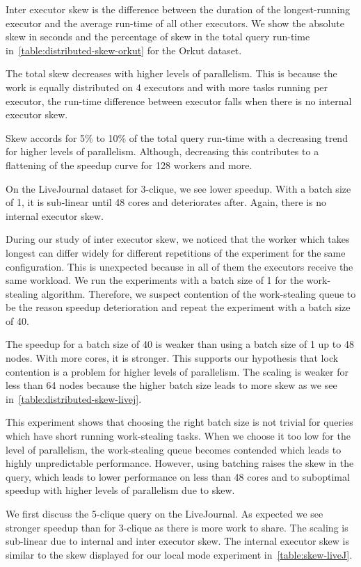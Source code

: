 Inter executor skew is the difference between the duration of the longest-running executor and the average
run-time of all other executors.
We show the absolute skew in seconds and the percentage of skew in the total query run-time
in~\cref{table:distributed-skew-orkut} for the Orkut dataset.

The total skew decreases with higher levels of parallelism.
This is because the work is equally distributed on 4 executors and with more tasks running per executor,
the run-time difference between executor falls when there is no internal executor skew.

Skew accords for 5\% to 10\% of the total query run-time with a decreasing trend for higher levels of
parallelism.
Although, decreasing this contributes to a flattening of the speedup curve for 128 workers and more.

On the LiveJournal dataset for 3-clique, we see lower speedup.
With a batch size of 1, it is sub-linear until 48 cores and deteriorates after.
Again, there is no internal executor skew.

During our study of inter executor skew, we noticed that the worker which takes longest can differ widely
for different repetitions of the experiment for the same configuration.
This is unexpected because in all of them the executors receive the same workload.
We run the experiments with a batch size of 1 for the work-stealing algorithm.
Therefore, we suspect contention of the work-stealing queue to be the reason speedup deterioration and
repeat the experiment with a batch size of 40.

The speedup for a batch size of 40 is weaker than using a batch size of 1 up to 48 nodes.
With more cores, it is stronger.
This supports our hypothesis that lock contention is a problem for higher levels of parallelism.
The scaling is weaker for less than 64 nodes because the higher batch size leads to more skew as we see
in~\cref{table:distributed-skew-livej}.

This experiment shows that choosing the right batch size is not trivial for queries which have
short running work-stealing tasks.
When we choose it too low for the level of parallelism, the work-stealing queue becomes contended which leads
to highly unpredictable performance.
However, using batching raises the skew in the query, which leads to lower performance on less
than 48 cores and to suboptimal speedup with higher levels of parallelism due to skew.

We first discuss the 5-clique query on the LiveJournal.
As expected we see stronger speedup than for 3-clique as there is more work to share.
The scaling is sub-linear due to internal and inter executor skew.
The internal executor skew is similar to the skew displayed for our local mode experiment in~\cref{table:skew-liveJ}.

